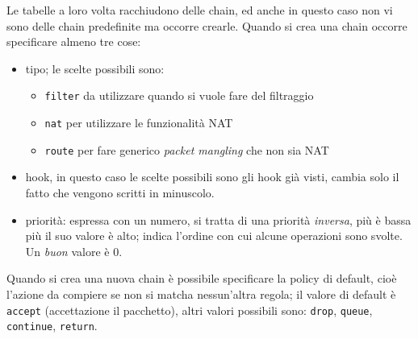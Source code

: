 Le tabelle a loro volta racchiudono delle chain, ed anche in questo caso non vi
sono delle chain predefinite ma occorre crearle. Quando si crea una chain occorre
specificare
almeno tre cose:
\begin{itemize}
	\item tipo; le scelte possibili sono:
	      \begin{itemize}
	      	\item \texttt{filter} da utilizzare quando si vuole fare del filtraggio
	      	\item \texttt{nat} per utilizzare le funzionalità NAT
	      	\item \texttt{route} per fare generico \textit{packet mangling} che non sia NAT
	      \end{itemize}
	\item hook, in questo caso le scelte possibili sono gli hook già visti, cambia solo
	      il fatto che vengono scritti in minuscolo.
	\item priorità: espressa con un numero, si tratta di una priorità \textit{inversa},
	      più è bassa più il suo valore è alto; indica l'ordine con cui alcune operazioni
	      sono svolte. Un \textit{buon} valore è 0.
\end{itemize}

Quando si crea una nuova chain è possibile specificare la policy di default, cioè
l'azione da compiere se non si matcha nessun'altra regola; il valore di default è
\texttt{accept} (accettazione il pacchetto), altri valori possibili sono: \texttt{drop},
\texttt{queue}, \texttt{continue}, \texttt{return}.


